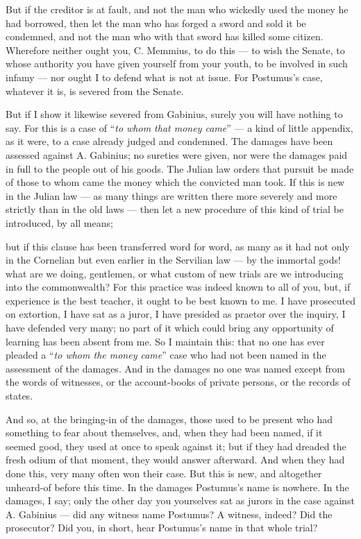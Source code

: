  But if the creditor is at fault, and not the man who wickedly used the money he had borrowed, then let the man who has forged a sword and sold it be condemned, and not the man who with that sword has killed some citizen. Wherefore neither ought you, C. Memmius, to do this --- to wish the Senate, to whose authority you have given yourself from your youth, to be involved in such infamy --- nor ought I to defend what is not at issue. For Postumus's case, whatever it is, is severed from the Senate.

 But if I show it likewise severed from Gabinius, surely you will have nothing to say. For this is a case of ``\textit{to whom that money came}'' --- a kind of little appendix, as it were, to a case already judged and condemned. The damages have been assessed against A. Gabinius; no sureties were given, nor were the damages paid in full to the people out of his goods. The Julian law orders that pursuit be made of those to whom came the money which the convicted man took. If this is new in the Julian law --- as many things are written there more severely and more strictly than in the old laws --- then let a new procedure of this kind of trial be introduced, by all means;

 but if this clause has been transferred word for word, as many as it had not only in the Cornelian but even earlier in the Servilian law --- by the immortal gods! what are we doing, gentlemen, or what custom of new trials are we introducing into the commonwealth? For this practice was indeed known to all of you, but, if experience is the best teacher, it ought to be best known to me. I have prosecuted on extortion, I have sat as a juror, I have presided as praetor over the inquiry, I have defended very many; no part of it which could bring any opportunity of learning has been absent from me. So I maintain this: that no one has ever pleaded a ``\textit{to whom the money came}'' case who had not been named in the assessment of the damages. And in the damages no one was named except from the words of witnesses, or the account-books of private persons, or the records of states.

 And so, at the bringing-in of the damages, those used to be present who had something to fear about themselves, and, when they had been named, if it seemed good, they used at once to speak against it; but if they had dreaded the fresh odium of that moment, they would answer afterward. And when they had done this, very many often won their case. But this is new, and altogether unheard-of before this time. In the damages Postumus's name is nowhere. In the damages, I say; only the other day you yourselves sat as jurors in the case against A. Gabinius --- did any witness name Postumus? A witness, indeed? Did the prosecutor? Did you, in short, hear Postumus's name in that whole trial?

